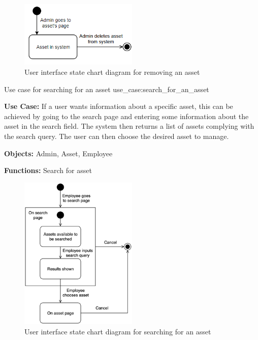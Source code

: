 \begin{figure}[H]
    \centering
    \includegraphics[width=0.5\textwidth]{figures/UseCases/DeleteAssetUseCase.png}
    \caption{User interface state chart diagram for removing an asset}
    \label{fig:remove_asset_statechart}
\end{figure}

\newpage

    {Use case for searching for an asset}
    {use_case:search_for_an_asset}
    {
        \textbf{Use Case:} If a user wants information about a specific asset, this can be achieved by going to the search page and entering some information about the asset in the search field. The system then returns a list of assets complying with the search query. The user can then choose the desired asset to manage.
    
        \vskip 0.2cm
        
        \textbf{Objects:} Admin, Asset, Employee
        
        \vskip 0.2cm
        
        \textbf{Functions:} Search for asset
    }

\begin{figure}[H]
    \centering
    \includegraphics[width=0.5\textwidth]{figures/UseCases/UC_Search_asset.png}
    \caption{User interface state chart diagram for searching for an asset}
    \label{fig:search_asset_statechart}
\end{figure}

